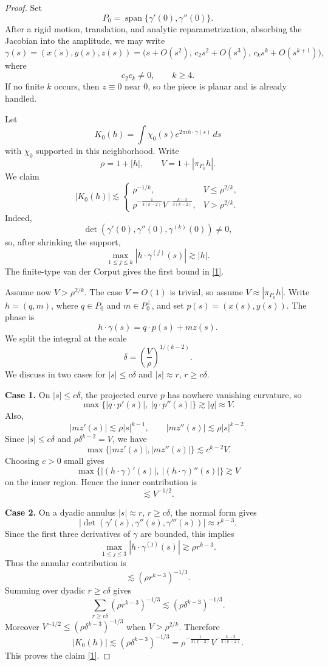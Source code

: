 \documentclass[11pt,reqno]{amsart}
\numberwithin{equation}{section}
\newcommand{\1}{\textbf{1}}
\newcommand{\ls}{\lesssim}
\begin{document}
\begin{proof}
		Set
		\[
		P_0=\operatorname{span}\{\gamma'(0),\gamma''(0)\}.
		\]
		After a rigid motion, translation, and analytic reparametrization, absorbing
		the Jacobian into the amplitude, we may write
		\[
		\gamma(s)=(x(s),y(s),z(s))
		=
		\bigl(s+O(s^2),\,c_2s^2+O(s^3),\,c_ks^k+O(s^{k+1})\bigr),
		\]
		where
		\[
		c_2c_k\neq0,\qquad k\ge4.
		\]
		If no finite \(k\) occurs, then \(z\equiv0\) near \(0\), so the piece is
		planar and is already handled.
		
		Let
		\[
		K_0(h)=\int \chi_0(s)e^{2\pi i h\cdot\gamma(s)}\,ds
		\]
		with \(\chi_0\) supported in this neighborhood.  Write
		\[
		\rho=1+|h|,
		\qquad
		V=1+|\pi_{P_0}h|.
		\]
		We claim
		\begin{equation}\label{1}
			|K_0(h)|
			\lesssim
			\begin{cases}
				\rho^{-1/k}, & V\le \rho^{2/k},\\[2mm]
				\rho^{-\frac1{3(k-2)}}V^{-\frac{k-3}{3(k-2)}},
				& V>\rho^{2/k}.
			\end{cases}
		\end{equation}
		Indeed,
		\[
		\det(\gamma'(0),\gamma''(0),\gamma^{(k)}(0))\neq0,
		\]
		so, after shrinking the support,
		\[
		\max_{1\le j\le k}|h\cdot\gamma^{(j)}(s)|\gtrsim |h|.
		\]
		The finite-type van der Corput gives the first bound in \eqref{1}.
		
		Assume now \(V>\rho^{2/k}\).  The case \(V=O(1)\) is trivial, so assume
		\(V\approx |\pi_{P_0}h|\).  Write \(h=(q,m)\), where
		\(q\in P_0\) and \(m\in P_0^\perp\), and set \(p(s)=(x(s),y(s))\). The phase is 
		\[h\cdot \gamma(s)=q\cdot p(s)+mz(s).\] We split the integral at the scale
		\[
		\delta=\left(\frac{V}{\rho}\right)^{1/(k-2)}.
		\]
		We discuss in two cases for \(|s|\le c\delta\) and \(|s|\approx r\), \(r\ge c\delta\).
		
		\noindent \textbf{Case 1. } On \(|s|\le c\delta\), the projected curve \(p\) has nowhere vanishing curvature,
		so
		\[
		\max\{|q\cdot p'(s)|,\ |q\cdot p''(s)|\}\gtrsim |q|\approx V.
		\]
		Also,
		\[
		|mz'(s)|\lesssim \rho |s|^{k-1},
		\qquad
		|mz''(s)|\lesssim \rho |s|^{k-2}.
		\]
		Since $|s|\le c\delta$ and $\rho \delta^{k-2}=V$, we have
		\[\max\{|mz'(s)|,	|mz''(s)|\}\ls c^{k-2}V.\]
		Choosing \(c>0\) small gives
		\[
		\max\{|(h\cdot\gamma)'(s)|,\ |(h\cdot\gamma)''(s)|\}\gtrsim V
		\]
		on the inner region.  Hence the inner contribution is
		\[
		\lesssim V^{-1/2}.
		\]
		
		\noindent \textbf{Case 2.}	On a dyadic annulus \(|s|\approx r\), \(r\ge c\delta\), the normal form gives
		\[
		|\det(\gamma'(s),\gamma''(s),\gamma'''(s))|\approx r^{k-3}.
		\]
		Since the first three derivatives of \(\gamma\) are bounded, this implies
		\[
		\max_{1\le j\le3}|h\cdot\gamma^{(j)}(s)|
		\gtrsim \rho r^{k-3}.
		\]
		Thus the annular contribution is
		\[
		\lesssim (\rho r^{k-3})^{-1/3}.
		\]
		Summing over dyadic \(r\ge c\delta\) gives
		\[
		\sum_{r\ge c\delta}(\rho r^{k-3})^{-1/3}
		\lesssim
		(\rho\delta^{k-3})^{-1/3}.
		\]
		Moreover \(V^{-1/2}\le(\rho\delta^{k-3})^{-1/3}\) when
		\(V>\rho^{2/k}\).  Therefore
		\[
		|K_0(h)|
		\lesssim
		(\rho\delta^{k-3})^{-1/3}
		=
		\rho^{-\frac1{3(k-2)}}V^{-\frac{k-3}{3(k-2)}}.
		\]
		This proves the claim \eqref{1}.
		

\end{proof}
\end{document}
